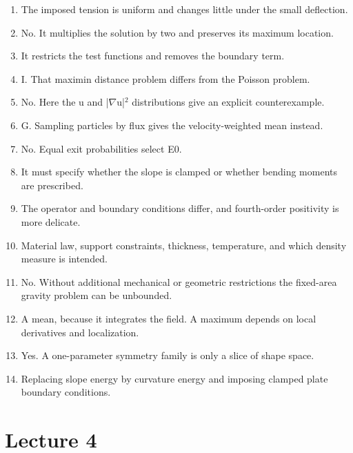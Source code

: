 \documentclass[11pt,oneside,openany]{book}
\begin{document}
\begin{enumerate}

\item The imposed tension is uniform and changes little under the small deflection.

\item No. It multiplies the solution by two and preserves its maximum location.

\item It restricts the test functions and removes the boundary term.

\item I. That maximin distance problem differs from the Poisson problem.

\item No. Here the u and |\ensuremath{\nabla}u|\ensuremath{^2} distributions give an explicit counterexample.

\item G. Sampling particles by flux gives the velocity-weighted mean instead.

\item No. Equal exit probabilities select E0.

\item It must specify whether the slope is clamped or whether bending moments are prescribed.

\item The operator and boundary conditions differ, and fourth-order positivity is more delicate.

\item Material law, support constraints, thickness, temperature, and which density measure is intended.

\item No. Without additional mechanical or geometric restrictions the fixed-area gravity problem can be unbounded.

\item A mean, because it integrates the field. A maximum depends on local derivatives and localization.

\item Yes. A one-parameter symmetry family is only a slice of shape space.

\item Replacing slope energy by curvature energy and imposing clamped plate boundary conditions.

\end{enumerate}

\section{Lecture 4}
\end{document}
